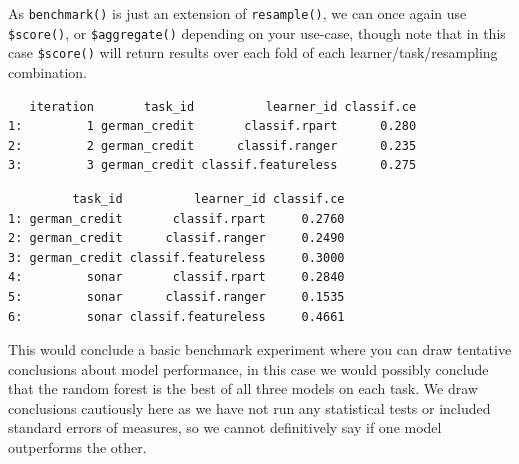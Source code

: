 As \texttt{benchmark()} is just an extension of \texttt{resample()}, we
can once again use \texttt{\$score()}, or \texttt{\$aggregate()}
depending on your use-case, though note that in this case
\texttt{\$score()} will return results over each fold of each
learner/task/resampling combination.

\begin{Shaded}
\begin{Highlighting}[]
\SpecialCharTok{$}\NormalTok{()[}\NormalTok{(}\NormalTok{, }\NormalTok{, }\NormalTok{), .(iteration, task\_id, learner\_id, classif.ce)]}
\end{Highlighting}
\end{Shaded}

\begin{verbatim}
   iteration       task_id          learner_id classif.ce
1:         1 german_credit       classif.rpart      0.280
2:         2 german_credit      classif.ranger      0.235
3:         3 german_credit classif.featureless      0.275
\end{verbatim}

\begin{Shaded}
\begin{Highlighting}[]
\SpecialCharTok{$}
\end{Highlighting}
\end{Shaded}

\begin{verbatim}
         task_id          learner_id classif.ce
1: german_credit       classif.rpart     0.2760
2: german_credit      classif.ranger     0.2490
3: german_credit classif.featureless     0.3000
4:         sonar       classif.rpart     0.2840
5:         sonar      classif.ranger     0.1535
6:         sonar classif.featureless     0.4661
\end{verbatim}

This would conclude a basic benchmark experiment where you can draw
tentative conclusions about model performance, in this case we would
possibly conclude that the random forest is the best of all three models
on each task. We draw conclusions cautiously here as we have not run any
statistical tests or included standard errors of measures, so we cannot
definitively say if one model outperforms the other.


